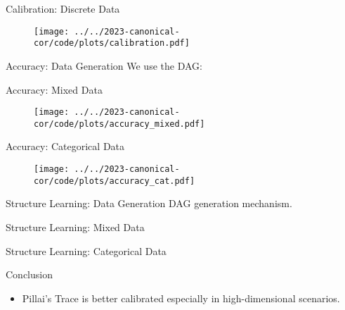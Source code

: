 \documentclass{beamer}
\begin{document}
\begin{frame}{Calibration: Discrete Data}
	\begin{figure}[t]
		\centering
		\texttt{[image: ../../2023-canonical-cor/code/plots/calibration.pdf]}
	\end{figure}
\end{frame}

\begin{frame}{Accuracy: Data Generation}
	We use the DAG:

\begin{center}
\end{center}
\end{frame}

\begin{frame}{Accuracy: Mixed Data}
	\begin{figure}[t]
		\centering
		\texttt{[image: ../../2023-canonical-cor/code/plots/accuracy\_mixed.pdf]}
	\end{figure}
\end{frame}

\begin{frame}{Accuracy: Categorical Data}
	\begin{figure}[t]
		\centering
		\texttt{[image: ../../2023-canonical-cor/code/plots/accuracy\_cat.pdf]}
	\end{figure}
\end{frame}


\begin{frame}{Structure Learning: Data Generation}
	DAG generation mechanism.
\end{frame}

\begin{frame}{Structure Learning: Mixed Data}
\end{frame}

\begin{frame}{Structure Learning: Categorical Data}
\end{frame}

\begin{frame}{Conclusion}
	\begin{itemize}
		\item Pillai's Trace is better calibrated especially in high-dimensional scenarios.
	\end{itemize}
\end{frame}
\end{document}
